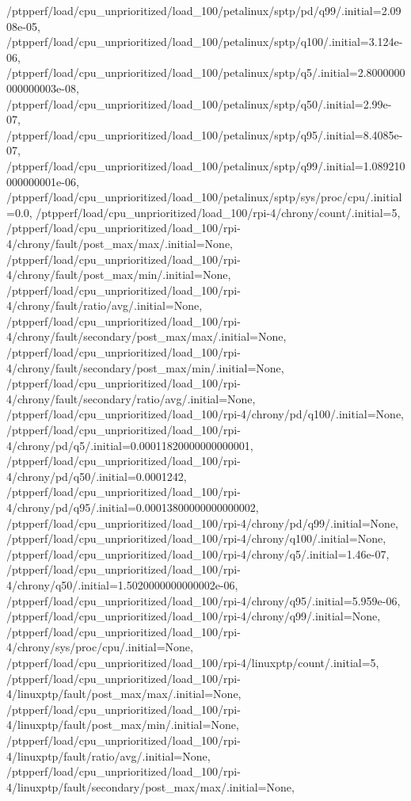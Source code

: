 {    /ptpperf/load/cpu_unprioritized/load_100/petalinux/sptp/pd/q99/.initial=2.0908e-05,
    /ptpperf/load/cpu_unprioritized/load_100/petalinux/sptp/q100/.initial=3.124e-06,
    /ptpperf/load/cpu_unprioritized/load_100/petalinux/sptp/q5/.initial=2.8000000000000003e-08,
    /ptpperf/load/cpu_unprioritized/load_100/petalinux/sptp/q50/.initial=2.99e-07,
    /ptpperf/load/cpu_unprioritized/load_100/petalinux/sptp/q95/.initial=8.4085e-07,
    /ptpperf/load/cpu_unprioritized/load_100/petalinux/sptp/q99/.initial=1.089210000000001e-06,
    /ptpperf/load/cpu_unprioritized/load_100/petalinux/sptp/sys/proc/cpu/.initial=0.0,
    /ptpperf/load/cpu_unprioritized/load_100/rpi-4/chrony/count/.initial=5,
    /ptpperf/load/cpu_unprioritized/load_100/rpi-4/chrony/fault/post_max/max/.initial=None,
    /ptpperf/load/cpu_unprioritized/load_100/rpi-4/chrony/fault/post_max/min/.initial=None,
    /ptpperf/load/cpu_unprioritized/load_100/rpi-4/chrony/fault/ratio/avg/.initial=None,
    /ptpperf/load/cpu_unprioritized/load_100/rpi-4/chrony/fault/secondary/post_max/max/.initial=None,
    /ptpperf/load/cpu_unprioritized/load_100/rpi-4/chrony/fault/secondary/post_max/min/.initial=None,
    /ptpperf/load/cpu_unprioritized/load_100/rpi-4/chrony/fault/secondary/ratio/avg/.initial=None,
    /ptpperf/load/cpu_unprioritized/load_100/rpi-4/chrony/pd/q100/.initial=None,
    /ptpperf/load/cpu_unprioritized/load_100/rpi-4/chrony/pd/q5/.initial=0.00011820000000000001,
    /ptpperf/load/cpu_unprioritized/load_100/rpi-4/chrony/pd/q50/.initial=0.0001242,
    /ptpperf/load/cpu_unprioritized/load_100/rpi-4/chrony/pd/q95/.initial=0.00013800000000000002,
    /ptpperf/load/cpu_unprioritized/load_100/rpi-4/chrony/pd/q99/.initial=None,
    /ptpperf/load/cpu_unprioritized/load_100/rpi-4/chrony/q100/.initial=None,
    /ptpperf/load/cpu_unprioritized/load_100/rpi-4/chrony/q5/.initial=1.46e-07,
    /ptpperf/load/cpu_unprioritized/load_100/rpi-4/chrony/q50/.initial=1.5020000000000002e-06,
    /ptpperf/load/cpu_unprioritized/load_100/rpi-4/chrony/q95/.initial=5.959e-06,
    /ptpperf/load/cpu_unprioritized/load_100/rpi-4/chrony/q99/.initial=None,
    /ptpperf/load/cpu_unprioritized/load_100/rpi-4/chrony/sys/proc/cpu/.initial=None,
    /ptpperf/load/cpu_unprioritized/load_100/rpi-4/linuxptp/count/.initial=5,
    /ptpperf/load/cpu_unprioritized/load_100/rpi-4/linuxptp/fault/post_max/max/.initial=None,
    /ptpperf/load/cpu_unprioritized/load_100/rpi-4/linuxptp/fault/post_max/min/.initial=None,
    /ptpperf/load/cpu_unprioritized/load_100/rpi-4/linuxptp/fault/ratio/avg/.initial=None,
    /ptpperf/load/cpu_unprioritized/load_100/rpi-4/linuxptp/fault/secondary/post_max/max/.initial=None,
}
